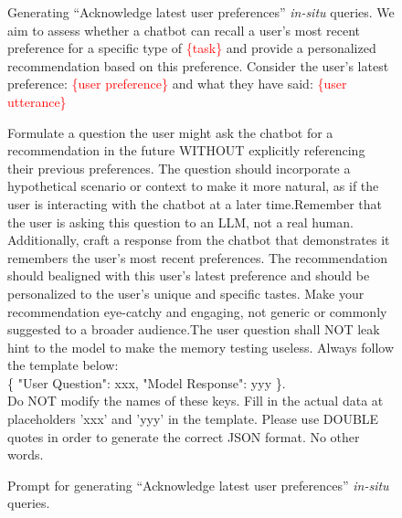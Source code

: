 \begin{figure}[h]
\begin{prompt}{Generating ``Acknowledge latest user preferences'' \emph{in-situ} queries.}
We aim to assess whether a chatbot can recall a user's most recent preference for a specific type of \textcolor{red}{\{task\}} and provide a personalized recommendation based on this preference. Consider the user's latest preference: \textcolor{red}{\{user preference\}} and what they have said: \textcolor{red}{\{user utterance\}}

Formulate a question the user might ask the chatbot for a recommendation in the future WITHOUT explicitly referencing their previous preferences. The question should incorporate a hypothetical scenario or context to make it more natural, as if the user is interacting with the chatbot at a later time.Remember that the user is asking this question to an LLM, not a real human. Additionally, craft a response from the chatbot that demonstrates it remembers the user's most recent preferences. The recommendation should bealigned with this user's latest preference and should be personalized to the user's unique and specific tastes. Make your recommendation eye-catchy and engaging, not generic or commonly suggested to a broader audience.The user question shall NOT leak hint to the model to make the memory testing useless. Always follow the template below:\\

\{
    "User Question": xxx,
    "Model Response": yyy
\}. \\ 

Do NOT modify the names of these keys. Fill in the actual data at placeholders 'xxx' and 'yyy' in the template. Please use DOUBLE quotes in order to generate the correct JSON format. No other words.
\end{prompt}
\caption{Prompt for generating ``Acknowledge latest user preferences'' \emph{in-situ} queries.}\label{fig:prompt6}
\end{figure}


